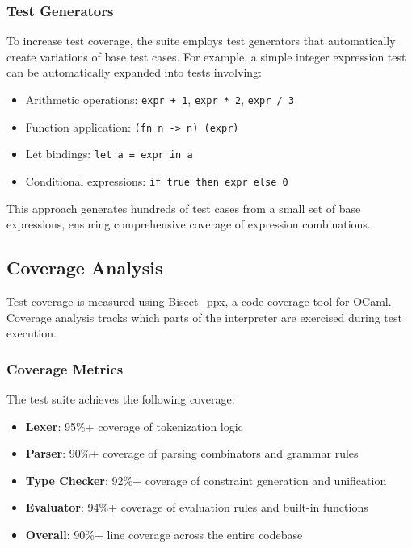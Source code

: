 \documentclass[conference,onecolumn]{IEEEtran}
\begin{document}
\subsubsection{Test Generators}

To increase test coverage, the suite employs test generators that automatically create variations of base test cases. For example, a simple integer expression test can be automatically expanded into tests involving:

\begin{itemize}
\item Arithmetic operations: \texttt{expr + 1}, \texttt{expr * 2}, \texttt{expr / 3}
\item Function application: \texttt{(fn n -> n) (expr)}
\item Let bindings: \texttt{let a = expr in a}
\item Conditional expressions: \texttt{if true then expr else 0}
\end{itemize}

This approach generates hundreds of test cases from a small set of base expressions, ensuring comprehensive coverage of expression combinations.

\subsection{Coverage Analysis}

Test coverage is measured using Bisect\_ppx, a code coverage tool for OCaml. Coverage analysis tracks which parts of the interpreter are exercised during test execution.

\subsubsection{Coverage Metrics}

The test suite achieves the following coverage:

\begin{itemize}
\item \textbf{Lexer}: 95\%+ coverage of tokenization logic
\item \textbf{Parser}: 90\%+ coverage of parsing combinators and grammar rules
\item \textbf{Type Checker}: 92\%+ coverage of constraint generation and unification
\item \textbf{Evaluator}: 94\%+ coverage of evaluation rules and built-in functions
\item \textbf{Overall}: 90\%+ line coverage across the entire codebase
\end{itemize}
\end{document}

